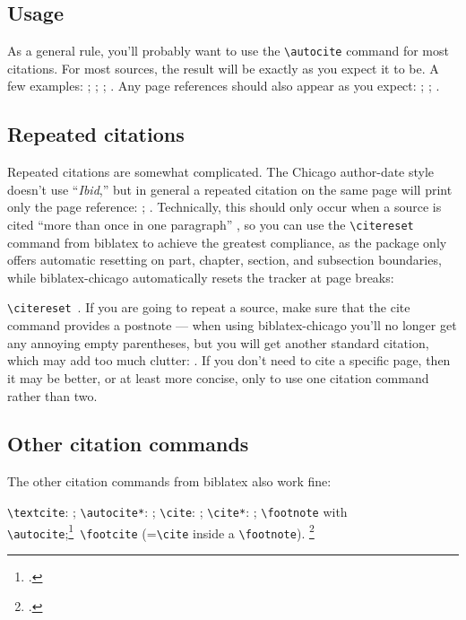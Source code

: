 \documentclass[a4paper,12pt]{report}
\newcommand{\cmd}[1]{\texttt{\textbackslash #1}}
\begin{document}
\subsection*{Usage}
\label{usage}

As a general rule, you'll probably want to use the \cmd{autocite}
command for most citations.  For most sources, the result will be
exactly as you expect it to be.  A few examples:
\autocite{adorno:benj}; \autocite{ashbrook:brain};
\autocite{babb:peru}; \autocite{barcott:review}.  Any page references
should also appear as you expect: \autocite[338]{batson};
\autocite[79]{beattie:crime}; \autocite[36]{boxer:china}.

\subsection*{Repeated citations}
\label{sec:ibidem}

Repeated citations are somewhat complicated.  The Chicago author-date
style doesn't use \enquote{\emph{Ibid},} but in general a repeated
citation on the same page will print only the page reference:
\autocite{browning:aurora}; \autocite[45]{browning:aurora}.
Technically, this should only occur when a source is cited
\enquote{more than once in one paragraph}
\autocite[15.26]{chicago:manual}, so you can use the \cmd{citereset}
command from \textsf{biblatex} to achieve the greatest compliance, as
the package only offers automatic resetting on part, chapter, section,
and subsection boundaries, while \textsf{biblatex-chicago}
automatically resets the tracker at page breaks:

\citereset\cmd{citereset}\ \autocite[15.27]{chicago:manual}.  If you
are going to repeat a source, make sure that the cite command provides
a postnote --- when using \textsf{biblatex-chicago} you'll no longer
get any annoying empty parentheses, but you will get another standard
citation, which may add too much clutter: \autocite{chicago:manual}.
If you don't need to cite a specific page, then it may be better, or
at least more concise, only to use one citation command rather than
two.

\subsection*{Other citation commands}
\label{sec:other}

The other citation commands from \textsf{biblatex} also work fine:

\cmd{textcite}: \textcite{conley:fifthgrade}; \cmd{autocite*}:
\autocite*{connell:chronic}; \cmd{cite}: \cite{conway:evolution};
\cmd{cite*}: \cite*{davenport:attention}; \cmd{foot\-note} with
\cmd{autocite};\footnote{\autocite{donne:var}.}\ \cmd{footcite}
(=\cmd{cite} inside a \cmd{footnote}).  \footcite{dunn:revolutions}
\end{document}
